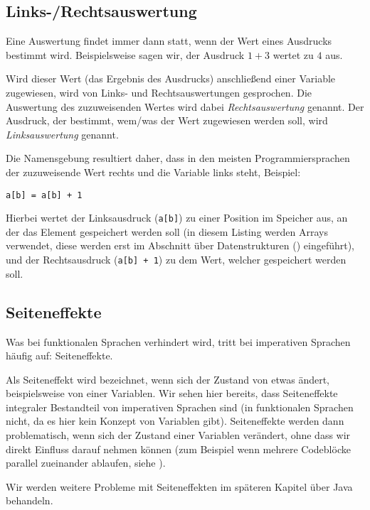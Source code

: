 \subsection{Links-/Rechtsauswertung} \imperativeMark \oopMark
	
	Eine Auswertung findet immer dann statt, wenn der Wert eines Ausdrucks bestimmt wird. Beispielsweise sagen wir, der Ausdruck $ 1 + 3 $ wertet zu $ 4 $ aus.
	
	Wird dieser Wert (das Ergebnis des Ausdrucks) anschließend einer Variable zugewiesen, wird von Links- und Rechtsauswertungen gesprochen. Die Auswertung des zuzuweisenden Wertes wird dabei \textit{Rechtsauswertung} genannt. Der Ausdruck, der bestimmt, wem/was der Wert zugewiesen werden soll, wird \textit{Linksauswertung} genannt.
	
	Die Namensgebung resultiert daher, dass in den meisten Programmiersprachen der zuzuweisende Wert rechts und die Variable links steht, Beispiel:
	\begin{lstlisting}
a[b] = a[b] + 1
	\end{lstlisting}
	Hierbei wertet der Linksausdruck (\texttt{a[b]}) zu einer Position im Speicher aus, an der das Element gespeichert werden soll (in diesem Listing werden Arrays verwendet, diese werden erst im Abschnitt über Datenstrukturen () eingeführt), und der Rechtsausdruck (\texttt{a[b] + 1}) zu dem Wert, welcher gespeichert werden soll.

\subsection{Seiteneffekte} \imperativeMark \oopMark
	
	Was bei funktionalen Sprachen verhindert wird, tritt bei imperativen Sprachen häufig auf: Seiteneffekte.
	
	Als Seiteneffekt wird bezeichnet, wenn sich der Zustand von etwas ändert, beispielsweise von einer Variablen. Wir sehen hier bereits, dass Seiteneffekte integraler Bestandteil von imperativen Sprachen sind (in funktionalen Sprachen nicht, da es hier kein Konzept von Variablen gibt). Seiteneffekte werden dann problematisch, wenn sich der Zustand einer Variablen verändert, ohne dass wir direkt Einfluss darauf nehmen können (zum Beispiel wenn mehrere Codeblöcke parallel zueinander ablaufen, siehe ).
	
	Wir werden weitere Probleme mit Seiteneffekten im späteren Kapitel über Java behandeln.
